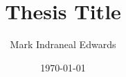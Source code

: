 \newpage



\newpage

\title{Thesis Title}
\author{Mark Indraneal Edwards}

\date{\today}
\maketitle
